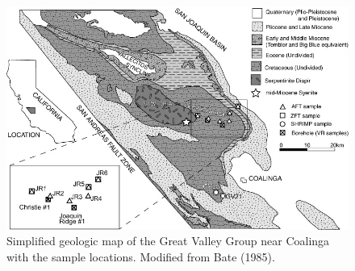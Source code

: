 \documentclass[11pt,twoside]{article}
\begin{document}
  \begin{figure}[here]
  \begin{center}
  \includegraphics[width=600pt]{geomapBate_small.jpg}
  \caption{ 
 Simplified geologic map of the  Great Valley Group near Coalinga with
 the sample locations.  Modified from  Bate (1985).}\label{fig:gvgeology}
  \end{center}
  \end{figure}
\end{document}
